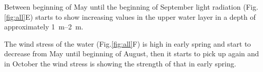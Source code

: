 \documentclass[../Main.tex]{subfiles}
\begin{document}
Between beginning of May until the beginning of September light radiation (Fig. \ref{fig:all}E) starts to show increasing values in the upper water layer in a depth of approximately \SIrange{1}{2}{\metre}.

The wind stress of the water (Fig.\ref{fig:all}F) is high in early spring and start to decrease from May until beginning of August, then it starts to pick up again and in October the wind stress is showing the strength of that in early spring. 
\end{document}
